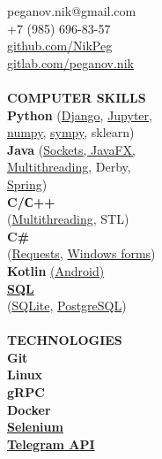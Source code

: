 \documentclass{article}
\begin{document}
\begin{vwcol}[widths={0.8,0.2},
 sep=.8cm, justify=flush,rule=0pt,indent=1em]
peganov.nik@gmail.com\\
+7 (985) 696-83-57\\
\href{https://github.com/NikPeg}{github.com/NikPeg}\\
\href{https://gitlab.com/peganov.nik}{gitlab.com/peganov.nik}\\
\\
\noindent\textcolor[rgb]{0.1255,0.2902,0.7843}{\textbf{COMPUTER SKILLS}}\\
\textbf{Python} (\href{https://github.com/igoose1/wikirace}{Django}, \href{https://github.com/NikPeg/synchronization-of-neuromorphic-networks-of-the-close-world-from-the-point-of-view-of-complexes}{Jupyter},\\
\href{https://github.com/NikPeg/Reinforcement-learning-for-resource-allocation-tasks-in-the-cloud}{numpy}, \href{https://github.com/NikPeg/Calculus_and_Algebra_sympy}{sympy}, sklearn)\\
\textbf{Java} (\href{https://github.com/NikPeg/jigsaw_sockets_and_saving}{Sockets, JavaFX,}\\
\href{https://github.com/NikPeg/StudentsBooks}{Multithreading}, Derby,\\
 \href{https://github.com/NikPeg/TukachBot}{Spring})\\
\textbf{C/С++}\\
(\href{https://github.com/NikPeg/OS_multithreaded_tasks}{Multithreading}, STL)\\
\textbf{C\#}\\
(\href{https://gitlab.com/peganov.nik/messengerapi}{Requests}, \href{https://gitlab.com/peganov.nik/diveintofractal}{Windows forms})\\
\textbf{Kotlin} \href{https://gitlab.com/peganov.nik/smartlearning}{(Android)}\\
\textbf{\href{https://github.com/NikPeg/CoffeePult}{SQL}}\\
(\href{https://github.com/NikPeg/ExtraterrestrialBot}{SQLite}, \href{https://github.com/NikPeg/CoffeePult}{PostgreSQL})\\
\\
\noindent\textcolor[rgb]{0.1255,0.2902,0.7843}{\textbf{TECHNOLOGIES}}\\
\textbf{
Git\\
Linux\\
gRPC\\
Docker\\
\href{https://github.com/NikPeg/csbot}{Selenium}\\
\href{https://github.com/NikPeg/TukachBot}{Telegram API}\\
}
\end{vwcol}
\end{document}
